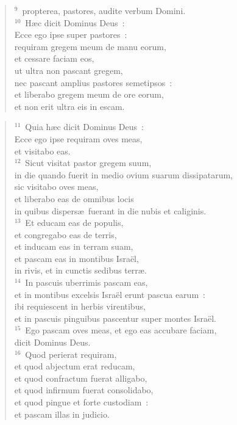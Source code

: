 \begin{flushleft}
\begin{verse}
${}^{9}$~propterea, pastores, audite verbum Domini.\\
${}^{10}$~H\ae c dicit Dominus Deus~:\\ Ecce ego ipse super pastores~:\\ requiram gregem meum de manu eorum,\\ et cessare faciam eos,\\ ut ultra non pascant gregem,\\ nec pascant amplius pastores semetipsos~:\\ et liberabo gregem meum de ore eorum,\\ et non erit ultra eis in escam.\end{verse}\end{flushleft}


\begin{flushleft}\begin{verse}${}^{11}$~Quia h\ae c dicit Dominus Deus~:\\ Ecce ego ipse requiram oves meas,\\ et visitabo eas.\\
${}^{12}$~Sicut visitat pastor gregem suum,\\ in die quando fuerit in medio ovium suarum dissipatarum,\\ sic visitabo oves meas,\\ et liberabo eas de omnibus locis\\ in quibus dispers\ae\ fuerant in die nubis et caliginis.\\
${}^{13}$~Et educam eas de populis,\\ et congregabo eas de terris,\\ et inducam eas in terram suam,\\ et pascam eas in montibus Isra\"el,\\ in rivis, et in cunctis sedibus terr\ae .\\
${}^{14}$~In pascuis uberrimis pascam eas,\\ et in montibus excelsis Isra\"el erunt pascua earum~:\\ ibi requiescent in herbis virentibus,\\ et in pascuis pinguibus pascentur super montes Isra\"el.\\
${}^{15}$~Ego pascam oves meas, et ego eas accubare faciam,\\ dicit Dominus Deus.\\
${}^{16}$~Quod perierat requiram,\\ et quod abjectum erat reducam,\\ et quod confractum fuerat alligabo,\\ et quod infirmum fuerat consolidabo,\\ et quod pingue et forte custodiam~:\\ et pascam illas in judicio.\\

\end{verse}
\end{flushleft}
